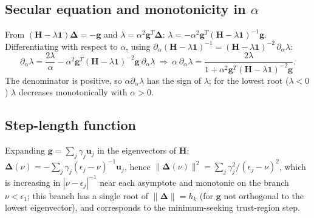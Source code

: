 \documentclass[11pt,a4paper]{article}
\newcommand{\bH}{\mathbf{H}}
\newcommand{\bg}{\mathbf{g}}
\newcommand{\bu}{\mathbf{u}}
\newcommand{\bd}{\boldsymbol{\Delta}}
\newcommand{\bone}{\mathbf{1}}
\begin{document}
\subsection{Secular equation and monotonicity in $\alpha$}
From $(\bH-\lambda\bone)\bd=-\bg$ and $\lambda=\alpha^2\bg^T\bd$: $\lambda=-\alpha^2\bg^T(\bH-\lambda\bone)^{-1}\bg$. Differentiating with respect to $\alpha$, using $\partial_\alpha(\bH-\lambda\bone)^{-1}=(\bH-\lambda\bone)^{-2}\,\partial_\alpha\lambda$:
\begin{equation}
 \partial_\alpha\lambda=\frac{2\lambda}{\alpha}-\alpha^2\bg^T(\bH-\lambda\bone)^{-2}\bg\ \partial_\alpha\lambda
 \ \Longrightarrow\
 \alpha\,\partial_\alpha\lambda=\frac{2\lambda}{1+\alpha^2\bg^T(\bH-\lambda\bone)^{-2}\bg}.
\end{equation}
The denominator is positive, so $\alpha\partial_\alpha\lambda$ has the sign of $\lambda$; for the lowest root ($\lambda<0$) $\lambda$ decreases monotonically with $\alpha>0$.

\subsection{Step-length function}
Expanding $\bg=\sum_j\gamma_j\bu_j$ in the eigenvectors of $\bH$: $\bd(\nu)=-\sum_j\gamma_j(\epsilon_j-\nu)^{-1}\bu_j$, hence $\|\bd(\nu)\|^2=\sum_j\gamma_j^2/(\epsilon_j-\nu)^2$, which is increasing in $|\nu-\epsilon_j|^{-1}$ near each asymptote and monotonic on the branch $\nu<\epsilon_1$; this branch has a single root of $\|\bd\|=h_k$ (for $\bg$ not orthogonal to the lowest eigenvector), and corresponds to the minimum-seeking trust-region step.
\end{document}
